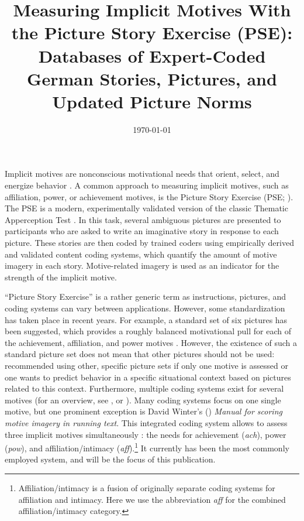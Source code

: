 \documentclass[man,a4paper,mask]{apa6}\usepackage[]{graphicx}\usepackage[]{color}
\title{Measuring Implicit Motives With the Picture Story Exercise (PSE): Databases of Expert-Coded German Stories, Pictures, and Updated Picture Norms}
\date{\today}
\begin{document}
\maketitle	%
Implicit motives are nonconscious motivational needs that orient, select, and energize behavior \parencite{mcclelland_human_1987}. A common approach to measuring implicit motives, such as affiliation, power, or achievement motives, is the Picture Story Exercise (PSE; ). The PSE is a modern, experimentally validated version of the classic Thematic Apperception Test \parencite{morgan_method_1935}. In this task, several ambiguous pictures are presented to participants who are asked to write an imaginative story in response to each picture. These stories are then coded by trained coders using empirically derived and validated content coding systems, which quantify the amount of motive imagery in each story. Motive-related imagery is used as an indicator for the strength of the implicit motive.

``Picture Story Exercise'' is a rather generic term as instructions, pictures, and coding systems can vary between applications. However, some standardization has taken place in recent years. For example, a standard set of six pictures has been suggested, which provides a roughly balanced motivational pull for each of the achievement, affiliation, and power motives \parencite{schultheiss_MeasuringImplicitMotives_2007}. However, the existence of such a standard picture set does not mean that other pictures should not be used: \textcite{schultheiss_MeasuringImplicitMotives_2007} recommended using other, specific picture sets if only one motive is assessed or one wants to predict behavior in a specific situational context based on pictures related to this context. Furthermore, multiple coding systems exist for several motives (for an overview, see , or ). Many coding systems focus on one single motive, but one prominent exception is David Winter's (\citeyear{winter_ManualScoringMotive_1994}) \emph{Manual for scoring motive imagery in running text}. This integrated coding system allows to assess three implicit motives simultaneously \parencite{winter_MeasuringPersonalityDistance_1991}: the needs for achievement (\emph{ach}), power (\emph{pow}), and affiliation/intimacy (\emph{aff}).\footnote{Affiliation/intimacy is a fusion of originally separate coding systems for affiliation and intimacy. Here we use the abbreviation \emph{aff} for the combined affiliation/intimacy category.} It currently has been the most commonly employed system, and will be the focus of this publication.
\end{document}
